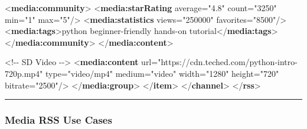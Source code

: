 \documentclass[
  letterpaper,
  DIV=11,
  numbers=noendperiod]{scrartcl}
\newenvironment{Shaded}{\begin{snugshade}}{\end{snugshade}}
\newcommand{\CommentTok}[1]{\textcolor[rgb]{0.37,0.37,0.37}{#1}}
\newcommand{\KeywordTok}[1]{\textcolor[rgb]{0.00,0.23,0.31}{\textbf{#1}}}
\newcommand{\NormalTok}[1]{\textcolor[rgb]{0.00,0.23,0.31}{#1}}
\newcommand{\OtherTok}[1]{\textcolor[rgb]{0.00,0.23,0.31}{#1}}
\newcommand{\StringTok}[1]{\textcolor[rgb]{0.13,0.47,0.30}{#1}}
\begin{document}
\begin{Shaded}
\begin{Highlighting}[]
\NormalTok{          \textless{}}\KeywordTok{media:community}\NormalTok{\textgreater{}}
\NormalTok{       \textless{}}\KeywordTok{media:starRating}\OtherTok{ average=}\StringTok{"4.8"}\OtherTok{ count=}\StringTok{"3250"}\OtherTok{ min=}\StringTok{"1"}\OtherTok{ max=}\StringTok{"5"}\NormalTok{/\textgreater{}}
\NormalTok{   \textless{}}\KeywordTok{media:statistics}\OtherTok{ views=}\StringTok{"250000"}\OtherTok{ favorites=}\StringTok{"8500"}\NormalTok{/\textgreater{}}
\NormalTok{       \textless{}}\KeywordTok{media:tags}\NormalTok{\textgreater{}python beginner{-}friendly hands{-}on tutorial\textless{}/}\KeywordTok{media:tags}\NormalTok{\textgreater{}}
\NormalTok{          \textless{}/}\KeywordTok{media:community}\NormalTok{\textgreater{}}
\NormalTok{      \textless{}/}\KeywordTok{media:content}\NormalTok{\textgreater{}}
        
        \CommentTok{\textless{}!{-}{-} SD Video {-}{-}\textgreater{}}
\NormalTok{        \textless{}}\KeywordTok{media:content} 
\OtherTok{   url=}\StringTok{"https://cdn.teched.com/python{-}intro{-}720p.mp4"}
\OtherTok{            type=}\StringTok{"video/mp4"}
\OtherTok{            medium=}\StringTok{"video"}
\OtherTok{            width=}\StringTok{"1280"}
\OtherTok{            height=}\StringTok{"720"}
\OtherTok{   bitrate=}\StringTok{"2500"}\NormalTok{/\textgreater{}}
\NormalTok{      \textless{}/}\KeywordTok{media:group}\NormalTok{\textgreater{}}
\NormalTok{    \textless{}/}\KeywordTok{item}\NormalTok{\textgreater{}}
\NormalTok{  \textless{}/}\KeywordTok{channel}\NormalTok{\textgreater{}}
\NormalTok{\textless{}/}\KeywordTok{rss}\NormalTok{\textgreater{}}
\end{Highlighting}
\end{Shaded}

\begin{center}\rule{0.5\linewidth}{0.5pt}\end{center}

\subsubsection{Media RSS Use Cases}\label{media-rss-use-cases}
\end{document}
